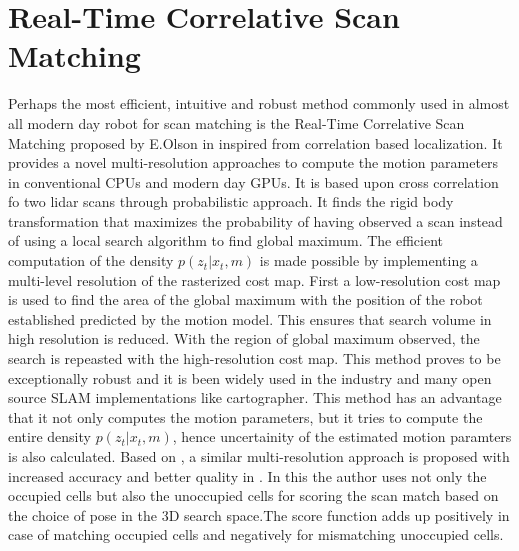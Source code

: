 \section{Real-Time Correlative Scan Matching}
    Perhaps the most efficient, intuitive and robust method commonly used in almost all modern day robot for scan matching is the Real-Time Correlative Scan Matching proposed by E.Olson in \cite{E.B.Olson} inspired from \cite{Konolige} 
correlation based localization. It provides a novel multi-resolution approaches to compute the motion parameters in conventional CPUs and modern day GPUs. It is based upon cross correlation fo two lidar scans through 
probabilistic approach. It finds the rigid body transformation that maximizes the probability of having observed a scan instead of using a local search algorithm to find global maximum. The efficient computation of the density
$p(z_t | x_t, m)$ is made possible by implementing a multi-level resolution of the rasterized cost map. First a low-resolution cost map is used to find the area of the global maximum with the position of the robot
established predicted by the motion model. This ensures that search volume in high resolution is reduced. With the region of global maximum observed, the search is repeasted with the high-resolution 
cost map. This method proves to be exceptionally robust and it is been widely used in the industry and many open source SLAM implementations like cartographer. 
    This method has an advantage that it not only computes the motion parameters, but it tries to compute the entire density $p(z_t | x_t, m)$, hence uncertainity of the estimated motion paramters is also calculated.
    Based on \cite{E.Olson}, a similar multi-resolution approach is proposed with increased accuracy and better quality in \cite{P.Vath}. In this the author uses not only the occupied cells but also the unoccupied cells for scoring the 
scan match based on the choice of pose in the 3D search space.The score function adds up positively in case of matching occupied cells and negatively for mismatching unoccupied cells.

